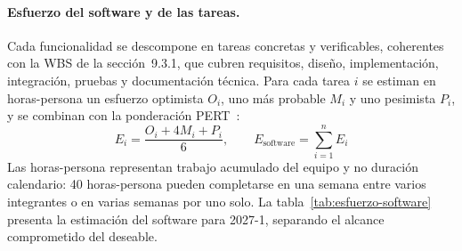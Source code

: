 \paragraph{Esfuerzo del software y de las tareas.} Cada funcionalidad se descompone en tareas concretas y verificables, coherentes con la WBS de la sección~9.3.1, que cubren requisitos, diseño, implementación, integración, pruebas y documentación técnica. Para cada tarea $i$ se estiman en horas-persona un esfuerzo optimista $O_i$, uno más probable $M_i$ y uno pesimista $P_i$, y se combinan con la ponderación PERT~\cite{pmi2017pmbok}:
\[ E_i = \frac{O_i + 4M_i + P_i}{6}, \qquad E_{\mathrm{software}} = \sum_{i=1}^{n} E_i \]
Las horas-persona representan trabajo acumulado del equipo y no duración calendario: 40 horas-persona pueden completarse en una semana entre varios integrantes o en varias semanas por uno solo. La tabla~\ref{tab:esfuerzo-software} presenta la estimación del software para 2027-1, separando el alcance comprometido del deseable.


